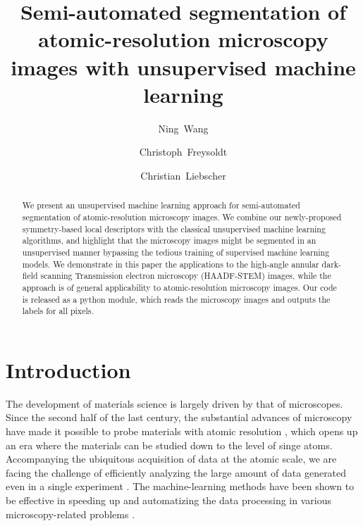 \documentclass[twocolumn,amsmath, floatfix]{revtex4}
\begin{document}
\title { Semi-automated segmentation of atomic-resolution microscopy images with unsupervised machine learning}
\author{Ning~Wang}
\author{Christoph~Freysoldt}
\author{Christian~Liebscher}
\begin{abstract}

We present an unsupervised machine learning approach for semi-automated segmentation of 
atomic-resolution microscopy images. 
We combine our newly-proposed symmetry-based local descriptors with the classical unsupervised machine learning algorithms, and highlight that the microscopy images might be segmented in an unsupervised manner bypassing the tedious training of supervised machine learning models.
We demonstrate in this paper the applications to the high-angle annular dark-field scanning Transmission electron microscopy (HAADF-STEM) images, while the approach is of general applicability to atomic-resolution microscopy images. 
Our code is released as a python module, which reads the microscopy images and outputs the labels for all pixels. 
\end{abstract}

\maketitle

\section{Introduction}
The development of materials science is largely driven by that of microscopes. Since the second half of the last century, the substantial advances of microscopy have made it possible to probe materials with atomic resolution \cite{Hansma209}, which opens up an era where the materials can be studied down to the level of singe atoms. 
Accompanying the ubiquitous acquisition of data at the atomic scale, we are facing the challenge of efficiently analyzing the large amount of data generated even in a single experiment \cite{Sergei2015}. The machine-learning methods have been shown to be effective in speeding up and automatizing the data processing in various microscopy-related problems \cite{Kaufmann2020,Sergei2019, Sergei2020}.
\end{document}

